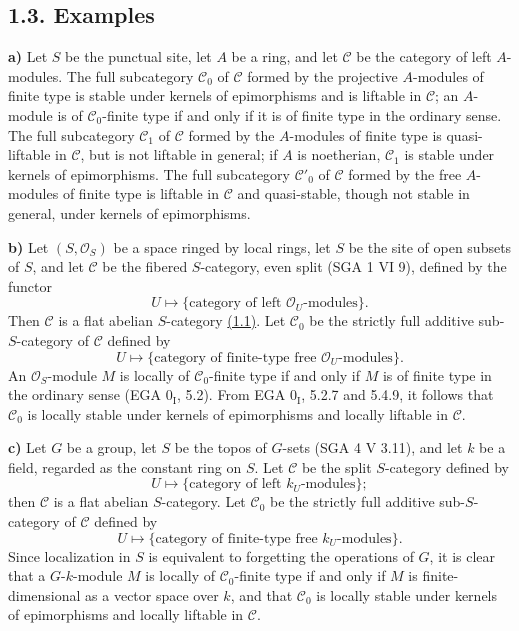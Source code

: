 \subsection*{1.3. Examples}

\textbf{a)} Let \(S\) be the punctual site, let \(A\) be a ring, and let \(\mathcal C\) be the category of left \(A\)-modules. The full subcategory \(\mathcal C_0\) of \(\mathcal C\) formed by the projective \(A\)-modules of finite type is stable under kernels of epimorphisms and is liftable in \(\mathcal C\); an \(A\)-module is of \(\mathcal C_0\)-finite type if and only if it is of finite type in the ordinary sense. The full subcategory \(\mathcal C_1\) of \(\mathcal C\) formed by the \(A\)-modules of finite type is quasi-liftable in \(\mathcal C\), but is not liftable in general; if \(A\) is noetherian, \(\mathcal C_1\) is stable under kernels of epimorphisms. The full subcategory \(\mathcal C'_0\) of \(\mathcal C\) formed by the free \(A\)-modules of finite type is liftable in \(\mathcal C\) and quasi-stable, though not stable in general, under kernels of epimorphisms.

\textbf{b)} Let \((S,\mathcal O_S)\) be a space ringed by local rings, let \(S\) be the site of open subsets of \(S\), and let \(\mathcal C\) be the fibered \(S\)-category, even split (SGA 1 VI 9), defined by the functor
\[
  U\longmapsto \{\text{category of left }\mathcal O_U\text{-modules}\}.
\]
Then \(\mathcal C\) is a flat abelian \(S\)-category \hyperlink{sga6.e01.sec.1.1}{(1.1)}. Let \(\mathcal C_0\) be the strictly full additive sub-\(S\)-category of \(\mathcal C\) defined by
\[
  U\longmapsto \{\text{category of finite-type free }\mathcal O_U\text{-modules}\}.
\]
An \(\mathcal O_S\)-module \(M\) is locally of \(\mathcal C_0\)-finite type if and only if \(M\) is of finite type in the ordinary sense (EGA \(0_{\mathrm I}\), 5.2). From EGA \(0_{\mathrm I}\), 5.2.7 and 5.4.9, it follows that \(\mathcal C_0\) is locally stable under kernels of epimorphisms and locally liftable in \(\mathcal C\).

\textbf{c)} Let \(G\) be a group, let \(S\) be the topos of \(G\)-sets (SGA 4 V 3.11), and let \(k\) be a field, regarded as the constant ring on \(S\). Let \(\mathcal C\) be the split \(S\)-category defined by
\[
  U\longmapsto \{\text{category of left }k_U\text{-modules}\};
\]
then \(\mathcal C\) is a flat abelian \(S\)-category. Let \(\mathcal C_0\) be the strictly full additive sub-\(S\)-category of \(\mathcal C\) defined by
\[
  U\longmapsto \{\text{category of finite-type free }k_U\text{-modules}\}.
\]
Since localization in \(S\) is equivalent to forgetting the operations of \(G\), it is clear that a \(G\)-\(k\)-module \(M\) is locally of \(\mathcal C_0\)-finite type if and only if \(M\) is finite-dimensional as a vector space over \(k\), and that \(\mathcal C_0\) is locally stable under kernels of epimorphisms and locally liftable in \(\mathcal C\).

